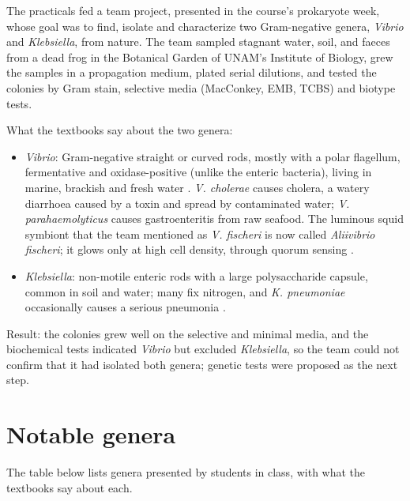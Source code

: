 The practicals fed a team project, presented
in the course's prokaryote week, whose goal
was to find, isolate and characterize two
Gram-negative genera, \emph{Vibrio} and
\emph{Klebsiella}, from nature. The team
sampled stagnant water, soil, and faeces from
a dead frog in the Botanical Garden of UNAM's
Institute of Biology, grew the samples in a
propagation medium, plated serial dilutions,
and tested the colonies by Gram stain,
selective media (MacConkey, EMB, TCBS) and
biotype tests.

What the textbooks say about the two genera:
\begin{itemize}
\item \emph{Vibrio}: Gram-negative straight
or curved rods, mostly with a polar
flagellum, fermentative and oxidase-positive
(unlike the enteric bacteria), living in
marine, brackish and fresh water
\cite[Section 17.12]{madigan2012brock}.
\emph{V. cholerae} causes cholera, a watery
diarrhoea caused by a toxin and spread by
contaminated water; \emph{V.
parahaemolyticus} causes gastroenteritis from
raw seafood. The luminous squid symbiont that
the team mentioned as \emph{V. fischeri} is
now called \emph{Aliivibrio fischeri}; it
glows only at high cell density, through
quorum sensing \cite[Sections 8.9 and
17.12]{madigan2012brock}.
\item \emph{Klebsiella}: non-motile enteric
rods with a large polysaccharide capsule,
common in soil and water; many fix nitrogen,
and \emph{K. pneumoniae} occasionally causes
a serious pneumonia \cite[Chapter
11]{tortora2013microbiology}.
\end{itemize}
Result: the colonies grew well on the
selective and minimal media, and the
biochemical tests indicated \emph{Vibrio} but
excluded \emph{Klebsiella}, so the team could
not confirm that it had isolated both genera;
genetic tests were proposed as the next step.

\section{Notable genera}
\label{section-genera}

The table below lists genera presented
by students in class, with what the textbooks say about each.

